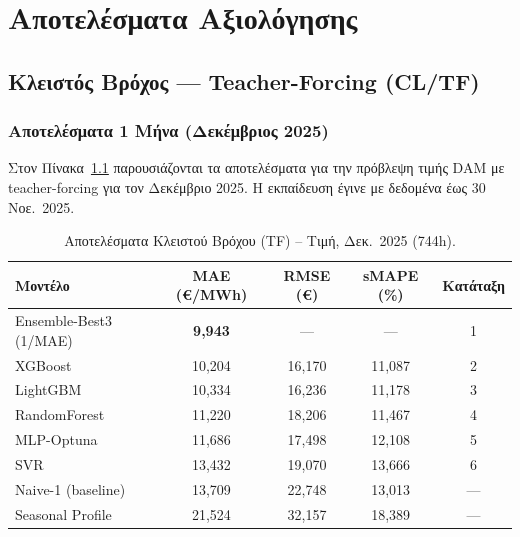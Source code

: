 \chapter{Αποτελέσματα Αξιολόγησης}
\label{ch:experiments}

\section{Κλειστός Βρόχος --- Teacher-Forcing (CL/TF)}
\label{sec:cl_results}

\subsection{Αποτελέσματα 1 Μήνα (Δεκέμβριος 2025)}

Στον Πίνακα~\ref{tab:cl_price_1m} παρουσιάζονται τα αποτελέσματα για την πρόβλεψη τιμής DAM
με teacher-forcing για τον Δεκέμβριο 2025. Η εκπαίδευση έγινε με δεδομένα έως 30 Νοε.\ 2025.

\begin{table}[H]
\centering
\caption{Αποτελέσματα Κλειστού Βρόχου (TF) -- Τιμή, Δεκ.\ 2025 (744h).}
\label{tab:cl_price_1m}
\begin{tabular}{lcccc}
\toprule
\textbf{Μοντέλο} & \textbf{MAE (€/MWh)} & \textbf{RMSE (€)} & \textbf{sMAPE (\%)} & \textbf{Κατάταξη} \\
\midrule
Ensemble-Best3 (1/MAE) & \textbf{9,943} & --- & --- & 1 \\
XGBoost & 10,204 & 16,170 & 11,087 & 2 \\
LightGBM & 10,334 & 16,236 & 11,178 & 3 \\
RandomForest & 11,220 & 18,206 & 11,467 & 4 \\
MLP-Optuna & 11,686 & 17,498 & 12,108 & 5 \\
SVR & 13,432 & 19,070 & 13,666 & 6 \\
\midrule
Naive-1 (baseline) & 13,709 & 22,748 & 13,013 & --- \\
Seasonal Profile & 21,524 & 32,157 & 18,389 & --- \\
\bottomrule
\end{tabular}
\end{table}

